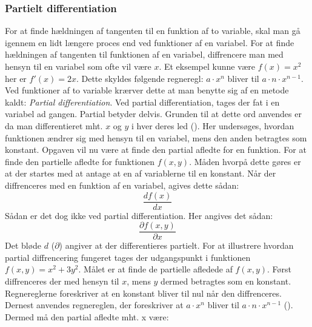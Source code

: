 \subsubsection{Partielt differentiation}\label{sec:PartieltDifferentiation}
For at finde hældningen af tangenten til en funktion af to variable, skal man gå igennem en lidt længere proces end ved funktioner af en variabel. For at finde hældningen af tangenten til funktionen af en variabel, diffrencere man med hensyn til en variabel som ofte vil være $x$. Et eksempel kunne være $f(x) = x^2$ her er $f'(x) = 2x$. Dette skyldes følgende regneregl: $a \cdot x^n$ bliver til $a \cdot n \cdot x^{n-1}$. \\ Ved funktioner af to variable krærver dette at man benytte sig af en metode kaldt: \textit{Partial differentiation}. Ved partial differentiation, tages der fat i en variabel ad gangen. Partial betyder delvis. Grunden til at dette ord anvendes er da man differentieret mht. $x$ og $y$ i hver deres led (\cite[4]{Larsen2016}). Her undersøges, hvordan funktionen ændrer sig med hensyn til en variabel, mens den anden betragtes som konstant. Opgaven vil nu være at finde den partial afledte for en funktion. For at finde den partielle afledte for funktionen $f(x,y)$. Måden hvorpå dette gøres er at der startes med at antage at en af variablerne til en konstant. Når der diffrenceres med en funktion af en variabel, agives dette sådan: \begin{equation*}\frac{d f(x)}{d x}\end{equation*} Sådan er det dog ikke ved partial differentiation. Her angives det sådan: \begin{equation}\frac{\partial f(x,y)}{\partial x}\end{equation} 
Det bløde $d$ (\begin{math}\partial\end{math}) angiver at der differentieres partielt. For at illustrere hvordan partial diffrencering fungeret tages der udgangspunkt i funktionen $f(x,y) = x^2 + 3y^2$. Målet er at finde de partielle afledede af $f(x,y)$. Først diffrenceres der med hensyn til $x$, mens $y$ dermed betragtes som en konstant. Regnereglerne foreskriver at en konstant bliver til nul når den diffrenceres. Dernest anvendes regnereglen, der foreskriver at \begin{math}a \cdot x^n\end{math} bliver til \begin{math}a \cdot n \cdot x^{n-1}\end{math} (\cite[14]{Pihl2019}). Dermed må den partial afledte mht. x være: 
